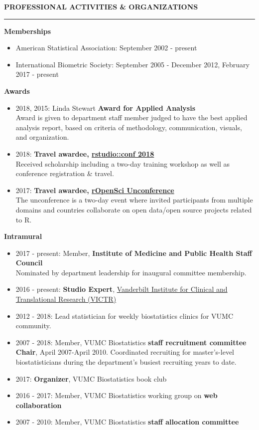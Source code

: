 \documentclass[5pt]{article}
\begin{document}
\clearpage
\noindent \linebreak \textbf{PROFESSIONAL ACTIVITIES \& ORGANIZATIONS}\\
\rule[5pt]{\linewidth}{1.0pt}
\noindent \textbf{Memberships}
\begin{itemize}
\item American Statistical Association: September 2002 - present
\item International Biometric Society: September 2005 - December 2012, February 2017 - present
\end{itemize}

\noindent \textbf{Awards}
\begin{itemize}
\item 2018, 2015: Linda Stewart \textbf{Award for Applied Analysis}\\
\indent Award is given to department staff member judged to have the best applied analysis report, based on criteria of methodology, communication, visuals, and organization.
\item 2018: \textbf{Travel awardee, \href{https://www.rstudio.com/conference/}{rstudio::conf 2018}}\\
\indent Received scholarship including a two-day training workshop as well as conference registration \& travel.
\item 2017: \textbf{Travel awardee, \href{unconf17.ropensci.org}{rOpenSci Unconference}}\\
\indent The unconference is a two-day event where invited participants from multiple domains and countries collaborate on open data/open source projects related to R.
\end{itemize}

\noindent \textbf{Intramural}
\begin{itemize}
\item 2017 - present: Member, \textbf{Institute of Medicine and Public Health Staff Council}\\
\indent Nominated by department leadership for inaugural committee membership.
\item 2016 - present: \textbf{Studio Expert}, \href{https://victr.vanderbilt.edu/pub/message.html?message_id=141}{Vanderbilt Institute for Clinical and Translational Research (VICTR)}
\item 2012 - 2018: Lead statistician for weekly biostatistics clinics for VUMC community.
\item 2007 - 2018: Member, VUMC Biostatistics \textbf{staff recruitment committee}\\ \textbf{Chair}, April 2007-April 2010. Coordinated recruiting for master's-level biostatisticians during the department's busiest recruiting years to date.
\item 2017: \textbf{Organizer}, VUMC Biostatistics book club
\item 2016 - 2017: Member, VUMC Biostatistics working group on \textbf{web collaboration}
\item 2007 - 2010: Member, VUMC Biostatistics \textbf{staff allocation committee}
\end{itemize}
\end{document}
